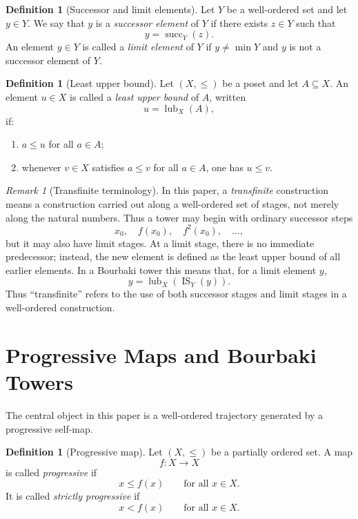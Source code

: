 \documentclass[11pt]{article}
\theoremstyle{definition}
\newtheorem{definition}[theorem]{Definition}
\theoremstyle{remark}
\newtheorem{remark}[theorem]{Remark}
\newcommand{\IS}{\operatorname{IS}}
\newcommand{\lub}{\operatorname{lub}}
\newcommand{\succop}{\operatorname{succ}}
\begin{document}
\begin{definition}[Successor and limit elements]
Let \(Y\) be a well-ordered set and let \(y\in Y\). We say that \(y\) is a
\emph{successor element} of \(Y\) if there exists \(z\in Y\) such that
\[
y=\succop_Y(z).
\]
An element \(y\in Y\) is called a \emph{limit element} of \(Y\) if \(y\neq \min Y\) and
\(y\) is not a successor element of \(Y\).
\end{definition}

\begin{definition}[Least upper bound]
Let \((X,\leq)\) be a poset and let \(A\subseteq X\). An element \(u\in X\) is called a
\emph{least upper bound} of \(A\), written
\[
u=\lub_X(A),
\]
if:
\begin{enumerate}
\item \(a\leq u\) for all \(a\in A\);
\item whenever \(v\in X\) satisfies \(a\leq v\) for all \(a\in A\), one has \(u\leq v\).
\end{enumerate}
\end{definition}

\begin{remark}[Transfinite terminology]
In this paper, a \emph{transfinite} construction means a construction carried out along a
well-ordered set of stages, not merely along the natural numbers. Thus a tower may begin
with ordinary successor steps
\[
x_0,\quad f(x_0),\quad f^2(x_0),\quad \ldots,
\]
but it may also have limit stages. At a limit stage, there is no immediate predecessor;
instead, the new element is defined as the least upper bound of all earlier elements. In a
Bourbaki tower this means that, for a limit element \(y\),
\[
y=\lub_X(\IS_Y(y)).
\]
Thus ``transfinite'' refers to the use of both successor stages and limit stages in a
well-ordered construction.
\end{remark}

\section{Progressive Maps and Bourbaki Towers}

The central object in this paper is a well-ordered trajectory generated by a progressive
self-map.

\begin{definition}[Progressive map]
Let \((X,\leq)\) be a partially ordered set. A map
\[
f:X\to X
\]
is called \emph{progressive} if
\[
x\leq f(x)
\qquad\text{for all }x\in X.
\]
It is called \emph{strictly progressive} if
\[
x<f(x)
\qquad\text{for all }x\in X.
\]
\end{definition}
\end{document}
